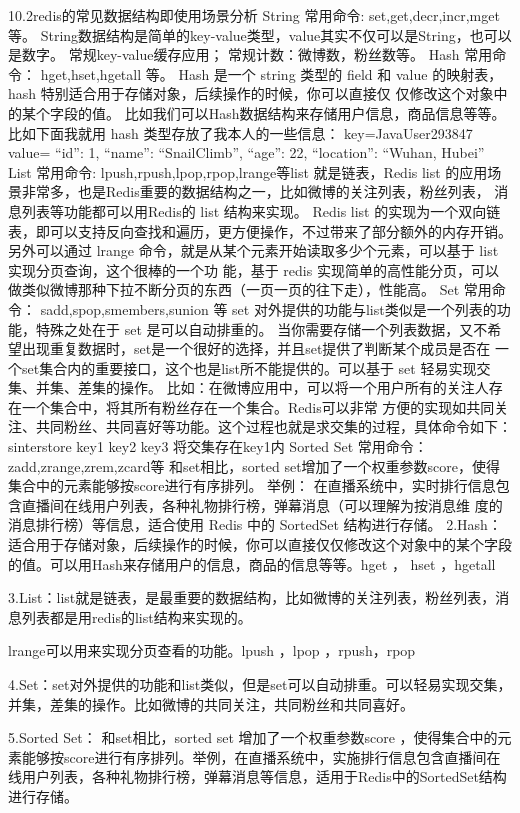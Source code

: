 \documentclass[UTF8]{ctexart}
\begin{document}
10.2redis的常见数据结构即使用场景分析
String
常用命令: set,get,decr,incr,mget 等。 String数据结构是简单的key-value类型，value其实不仅可以是String，也可以是数字。 常规key-value缓存应用； 常规计数：微博数，粉丝数等。
Hash
常用命令： hget,hset,hgetall 等。
Hash 是一个 string 类型的 ﬁeld 和 value 的映射表，hash 特别适合用于存储对象，后续操作的时候，你可以直接仅 仅修改这个对象中的某个字段的值。 比如我们可以Hash数据结构来存储用户信息，商品信息等等。比如下面我就用 hash 类型存放了我本人的一些信息：
key=JavaUser293847 value={ “id”: 1, “name”: “SnailClimb”, “age”: 22, “location”: “Wuhan, Hubei” }
List
常用命令: lpush,rpush,lpop,rpop,lrange等list 就是链表，Redis list 的应用场景非常多，也是Redis重要的数据结构之一，比如微博的关注列表，粉丝列表， 消息列表等功能都可以用Redis的 list 结构来实现。 Redis list 的实现为一个双向链表，即可以支持反向查找和遍历，更方便操作，不过带来了部分额外的内存开销。
另外可以通过 lrange 命令，就是从某个元素开始读取多少个元素，可以基于 list 实现分页查询，这个很棒的一个功 能，基于 redis 实现简单的高性能分页，可以做类似微博那种下拉不断分页的东西（一页一页的往下走），性能高。
Set
常用命令： sadd,spop,smembers,sunion 等 set 对外提供的功能与list类似是一个列表的功能，特殊之处在于 set 是可以自动排重的。
当你需要存储一个列表数据，又不希望出现重复数据时，set是一个很好的选择，并且set提供了判断某个成员是否在 一个set集合内的重要接口，这个也是list所不能提供的。可以基于 set 轻易实现交集、并集、差集的操作。 比如：在微博应用中，可以将一个用户所有的关注人存在一个集合中，将其所有粉丝存在一个集合。Redis可以非常 方便的实现如共同关注、共同粉丝、共同喜好等功能。这个过程也就是求交集的过程，具体命令如下：
sinterstore key1 key2 key3 将交集存在key1内
Sorted Set
常用命令： zadd,zrange,zrem,zcard等 和set相比，sorted set增加了一个权重参数score，使得集合中的元素能够按score进行有序排列。
举例： 在直播系统中，实时排行信息包含直播间在线用户列表，各种礼物排行榜，弹幕消息（可以理解为按消息维 度的消息排行榜）等信息，适合使用 Redis 中的 SortedSet 结构进行存储。
2.Hash： 适合用于存储对象，后续操作的时候，你可以直接仅仅修改这个对象中的某个字段的值。可以用Hash来存储用户的信息，商品的信息等等。hget ， hset ，hgetall

3.List：list就是链表，是最重要的数据结构，比如微博的关注列表，粉丝列表，消息列表都是用redis的list结构来实现的。

lrange可以用来实现分页查看的功能。lpush ，lpop ，rpush，rpop

4.Set：set对外提供的功能和list类似，但是set可以自动排重。可以轻易实现交集，并集，差集的操作。比如微博的共同关注，共同粉丝和共同喜好。

5.Sorted Set： 和set相比，sorted set 增加了一个权重参数score ，使得集合中的元素能够按score进行有序排列。举例，在直播系统中，实施排行信息包含直播间在线用户列表，各种礼物排行榜，弹幕消息等信息，适用于Redis中的SortedSet结构进行存储。
\end{document}
